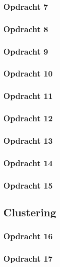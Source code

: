 \documentclass[11pt, a4paper, titlepage, openright]{article}
\begin{document}
	\subsubsection{Opdracht 7}

	\subsubsection{Opdracht 8}

	\subsubsection{Opdracht 9}

	\subsubsection{Opdracht 10}

	\subsubsection{Opdracht 11}

	\subsubsection{Opdracht 12}

	\subsubsection{Opdracht 13}

	\subsubsection{Opdracht 14}

	\subsubsection{Opdracht 15}


	\subsection{Clustering}

	\subsubsection{Opdracht 16}

	\subsubsection{Opdracht 17}
\end{document}
